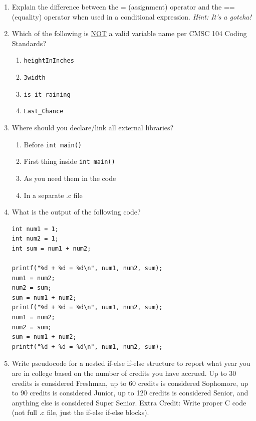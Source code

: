\documentclass[letter,11pt]{article}
\begin{document}
\begin{enumerate}
    \item Explain the difference between the = (assignment) operator and the == (equality) operator when used in a conditional expression. \textit{Hint: It's a gotcha!}
    
    \item Which of the following is \underline{NOT} a valid variable name per CMSC 104 Coding Standards?
    \begin{enumerate}
        \item \texttt{heightInInches}
        \item \texttt{3width}
        \item \texttt{is\_it\_raining}
        \item \texttt{Last\_Chance}
    \end{enumerate}
    
    \item Where should you declare/link all external libraries?
    \begin{enumerate}
        \item Before \texttt{int main()}
        \item First thing inside \texttt{int main()}
        \item As you need them in the code
        \item In a separate .c file
    \end{enumerate}
    
    \item What is the output of the following code?
    \begin{verbatim}
int num1 = 1;
int num2 = 1;
int sum = num1 + num2;

printf("%d + %d = %d\n", num1, num2, sum);
num1 = num2;
num2 = sum;
sum = num1 + num2;
printf("%d + %d = %d\n", num1, num2, sum);
num1 = num2;
num2 = sum;
sum = num1 + num2;
printf("%d + %d = %d\n", num1, num2, sum);
\end{verbatim}

    \item Write pseudocode for a nested if-else if-else structure to report what year you are in college based on the number of credits you have accrued. Up to 30 credits is considered Freshman, up to 60 credits is considered Sophomore, up to 90 credits is considered Junior, up to 120 credits is considered Senior, and anything else is considered Super Senior. Extra Credit: Write proper C code (not full .c file, just the if-else if-else blocks).
\end{enumerate}
\end{document}
